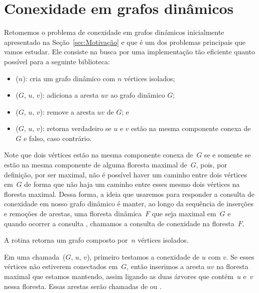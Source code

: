 \chapter{Conexidade em grafos dinâmicos}
\label{sec:connDG}
Retomemos o problema de conexidade em grafos dinâmicos inicialmente apresentado na Seção~\ref{sec:Motivação} e que é um dos problemas principais que vamos estudar. Ele consiste na busca por uma implementação tão eficiente quanto possível para a seguinte biblioteca: 
\begin{itemize}
\item \dymGraphCreate($n$): cria um grafo dinâmico com $n$ vértices isolados;
\item \dymGraphAddEdge($G$, $u$, $v$): adiciona a aresta $uv$ ao grafo dinâmico $G$;
\item \dymGraphDelEdge($G$, $u$, $v$): remove a aresta $uv$ de $G$; e
\item \dymGraphQuery($G$, $u$, $v$): retorna verdadeiro se $u$ e $v$ estão na mesma componente conexa de $G$ e falso, caso contrário.
\end{itemize}

Note que dois vértices estão na mesma componente conexa de~$G$ se e somente se estão na mesma componente de alguma floresta maximal de~$G$, pois, por definição, por ser maximal, não é possível haver um caminho entre dois vértices em~$G$ de forma que não haja um caminho entre esses mesmo dois vértices na floresta maximal. Dessa forma, a ideia que usaremos para responder a consulta de conexidade em nosso grafo dinâmico é manter, ao longo da sequência de inserções e remoções de arestas, uma floresta dinâmica~$F$ que seja maximal em~$G$ e quando ocorrer a consulta \dymGraphQuery{}, chamamos a consulta de conexidade na floresta~$F$.

A rotina \dymGraphCreate{} retorna um grafo composto por~$n$ vértices isolados.

Em uma chamada~\dymGraphAddEdge($G$, $u$, $v$), primeiro testamos a conexidade de $u$ com $v$. Se esses vértices não estiverem conectados em~$G$, então inserimos a aresta $uv$ na floresta maximal que estamos mantendo, assim ligando as duas árvores que contém~$u$ e~$v$ nessa floresta. Essas arestas serão chamadas de  ou .

